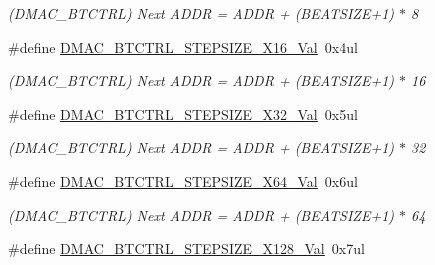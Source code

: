 \begin{DoxyCompactItemize}
\begin{DoxyCompactList}\small\item\em (D\+M\+A\+C\+\_\+\+B\+T\+C\+T\+R\+L) Next A\+D\+D\+R = A\+D\+D\+R + (B\+E\+A\+T\+S\+I\+Z\+E+1) $\ast$ 8 \end{DoxyCompactList}\item 
\hypertarget{group___s_a_m_l21___d_m_a_c_ga6be80c72116b230cffb8afd5874cae02}{}\#define \hyperlink{group___s_a_m_l21___d_m_a_c_ga6be80c72116b230cffb8afd5874cae02}{D\+M\+A\+C\+\_\+\+B\+T\+C\+T\+R\+L\+\_\+\+S\+T\+E\+P\+S\+I\+Z\+E\+\_\+\+X16\+\_\+\+Val}~0x4ul\label{group___s_a_m_l21___d_m_a_c_ga6be80c72116b230cffb8afd5874cae02}

\begin{DoxyCompactList}\small\item\em (D\+M\+A\+C\+\_\+\+B\+T\+C\+T\+R\+L) Next A\+D\+D\+R = A\+D\+D\+R + (B\+E\+A\+T\+S\+I\+Z\+E+1) $\ast$ 16 \end{DoxyCompactList}\item 
\hypertarget{group___s_a_m_l21___d_m_a_c_gabc372a6f4800c89ffc625b791a95a710}{}\#define \hyperlink{group___s_a_m_l21___d_m_a_c_gabc372a6f4800c89ffc625b791a95a710}{D\+M\+A\+C\+\_\+\+B\+T\+C\+T\+R\+L\+\_\+\+S\+T\+E\+P\+S\+I\+Z\+E\+\_\+\+X32\+\_\+\+Val}~0x5ul\label{group___s_a_m_l21___d_m_a_c_gabc372a6f4800c89ffc625b791a95a710}

\begin{DoxyCompactList}\small\item\em (D\+M\+A\+C\+\_\+\+B\+T\+C\+T\+R\+L) Next A\+D\+D\+R = A\+D\+D\+R + (B\+E\+A\+T\+S\+I\+Z\+E+1) $\ast$ 32 \end{DoxyCompactList}\item 
\hypertarget{group___s_a_m_l21___d_m_a_c_ga4c940b8055fe3e170f6d069523d1dc5a}{}\#define \hyperlink{group___s_a_m_l21___d_m_a_c_ga4c940b8055fe3e170f6d069523d1dc5a}{D\+M\+A\+C\+\_\+\+B\+T\+C\+T\+R\+L\+\_\+\+S\+T\+E\+P\+S\+I\+Z\+E\+\_\+\+X64\+\_\+\+Val}~0x6ul\label{group___s_a_m_l21___d_m_a_c_ga4c940b8055fe3e170f6d069523d1dc5a}

\begin{DoxyCompactList}\small\item\em (D\+M\+A\+C\+\_\+\+B\+T\+C\+T\+R\+L) Next A\+D\+D\+R = A\+D\+D\+R + (B\+E\+A\+T\+S\+I\+Z\+E+1) $\ast$ 64 \end{DoxyCompactList}\item 
\hypertarget{group___s_a_m_l21___d_m_a_c_gac60f6c18ae8ba088c4b1c09764074bb5}{}\#define \hyperlink{group___s_a_m_l21___d_m_a_c_gac60f6c18ae8ba088c4b1c09764074bb5}{D\+M\+A\+C\+\_\+\+B\+T\+C\+T\+R\+L\+\_\+\+S\+T\+E\+P\+S\+I\+Z\+E\+\_\+\+X128\+\_\+\+Val}~0x7ul\label{group___s_a_m_l21___d_m_a_c_gac60f6c18ae8ba088c4b1c09764074bb5}


\end{DoxyCompactItemize}
